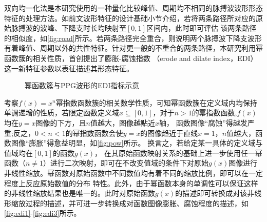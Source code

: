 双向均一化法是本研究使用的一种量化比较峰值、周期均不相同的脉搏波波形形态特征的处理方法。如前文波形特征的设计基础小节介绍，若将两条路径所对应的原始脉搏波的波峰、下降支时长均映射至$[0,1]$区间内，此时即可评估
该两条路径的相似度，如\autoref{fig:road}所示。若两条路径完全重合，则说明两个脉搏波下降支波形有着峰值、周期以外的共性特征。针对更一般的不重合的两条路径，本研究利用幂函数簇的相关性质，首创提出了膨胀-腐蚀指数
（erode and dilate index，EDI）这一新特征参数以表征描述其形态特征。
\begin{figure}[h]
    \centering
    \quad
    \quad
    \quad
    \caption{\label{fig:powandedi}幂函数簇与PPG波形的EDI指标示意}
\end{figure}


考察$f(x)=x^n$幂指数函数簇的相关数学性质，可知幂函数簇在定义域内均保持单调递增的性质，若限定函数定义域$x\subseteq [0,1]$，对于$n>1$的幂指数函数,$f(x)$均在$y=x$图像的下方，且$n$值越大，图像越贴近$x$轴，
函数图像“腐蚀”得越发严重;反之，$0<n<1$的幂指数函数会使$y=x$的图像趋近于直线$x=1$，$n$值越大，函数图像“膨胀”得愈益明显，如\autoref{fig:pow}所示。
换言之，若给定某一具体的定义域与值域均在$[0,1]$的函数$g(x)$，
在其原始函数映射关系的基础上进一步使用任一幂函数（$n\neq 1$）进行二次映射，即可在不改变值域的条件下对原始$g(x)$图像进行非线性缩放。幂函数对原始函数中不同数值均有着不同的缩放比例，即可以在一定程度上反应原始数值的分布
特性。此外，由于幂函数本身的单调性可以保证这样的非线性缩放结果也是唯一的。此时对原始函数$g(x)$的描述即可转换成对该非线形缩放过程的描述，并可进一步转换成对函数图像膨胀、腐蚀程度的描述，如\autoref{fig:edi1}-\autoref{fig:edi3}所示。

